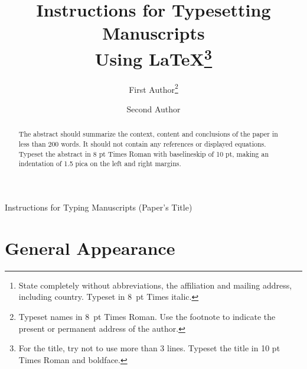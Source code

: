 \documentclass{ws-ijait}
\begin{document}
{Instructions for Typing Manuscripts (Paper's Title)}

%
\catchline{}{}{}{}{}
%

\title{Instructions for Typesetting Manuscripts\\
Using \LaTeX\footnote{For the title, try not to use more than
3 lines. Typeset the title in 10 pt Times Roman and
boldface.}
}

\author{First Author\footnote{
Typeset names in 8~pt Times Roman. Use the footnote
to indicate the present or permanent address of the author.}}

\address{University Department, University Name, Address\\
City, State ZIP/Zone,
Country\footnote{State completely without abbreviations, the
affiliation and mailing address, including country. Typeset in 8~pt
Times italic.}\\
first\_author@university.edu}

\author{Second Author}

\address{Group, Laboratory, Address\\
City, State ZIP/Zone, Country\\
second\_author@group.com}

\maketitle

\begin{history}
\end{history}

\begin{abstract}
The abstract should summarize the context, content
and conclusions of the paper in less than 200 words. It should
not contain any references or displayed equations. Typeset the
abstract in 8 pt Times Roman with baselineskip of 10 pt, making
an indentation of 1.5 pica on the left and right margins.
\end{abstract}


\section{General Appearance}	
\end{document}
